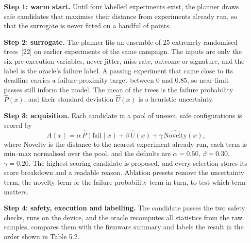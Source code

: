 \documentclass[12pt,a4paper]{article}
\begin{document}
\textbf{Step 1: warm start.} Until four labelled experiments exist, the planner draws safe candidates that maximise their distance from experiments already run, so that the surrogate is never fitted on a handful of points.

\textbf{Step 2: surrogate.} The planner fits an ensemble of 25 extremely randomised trees~[22] on earlier experiments of the same campaign. The inputs are only the six pre-execution variables, never jitter, miss rate, outcome or signature, and the label is the oracle's failure label. A passing experiment that came close to its deadline carries a failure-proximity target between 0 and 0.85, so near-limit passes still inform the model. The mean of the trees is the failure probability $\hat P(x)$, and their standard deviation $\hat U(x)$ is a heuristic uncertainty.

\textbf{Step 3: acquisition.} Each candidate in a pool of unseen, safe configurations is scored by
\begin{equation*}
A(x) = \alpha\,\hat P(\text{fail}\mid x) + \beta\,\hat U(x) + \gamma\,\widehat{\text{Novelty}}(x),
\end{equation*}
where Novelty is the distance to the nearest experiment already run, each term is min--max normalised over the pool, and the defaults are $\alpha=0.50$, $\beta=0.30$, $\gamma=0.20$. The highest-scoring candidate is proposed, and every selection stores its score breakdown and a readable reason. Ablation presets remove the uncertainty term, the novelty term or the failure-probability term in turn, to test which term matters.

\textbf{Step 4: safety, execution and labelling.} The candidate passes the two safety checks, runs on the device, and the oracle recomputes all statistics from the raw samples, compares them with the firmware summary and labels the result in the order shown in Table 5.2.
\end{document}
